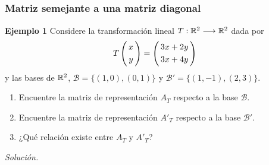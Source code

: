 \subsection{}
%
\begin{frame}\frametitle{Matriz semejante a una matriz diagonal}
	
	\begin{ej}{\textbf{Ejemplo 1}}
		Considere la transformación lineal $T:\mathbb{R}^2\longrightarrow\mathbb{R}^2$ dada por
		\[
		T\left(
		\begin{array}{@{\hspace{0.3\tabcolsep}}c@{\hspace{0.3\tabcolsep}}}
		x  \\[1mm]
		y  
		\end{array}
		\right)
		=
		\left(
		\begin{array}{@{\hspace{0.3\tabcolsep}}c@{\hspace{0.3\tabcolsep}}}
		3x+2y  \\[1mm]
		3x+4y 
		\end{array}
		\right)
		\]
		y las bases de $\mathbb{R}^2$, $\mathcal{B}=\{(1,0), (0,1)\}$ y $\mathcal{B}'=\{(1,-1), (2,3)\}$.
		
		\begin{enumerate}[$a$]
			\justifying
			\item Encuentre la matriz de representación $A_T$ respecto a la base  $\mathcal{B}$.
			\item Encuentre la matriz de representación ${A'}_T$ respecto a la base  $\mathcal{B}'$.
			\item ¿Qué relación existe entre $A_T$ y ${A'}_T$?
		\end{enumerate}
	\end{ej}
	\textit{Solución.}
	
\end{frame}

